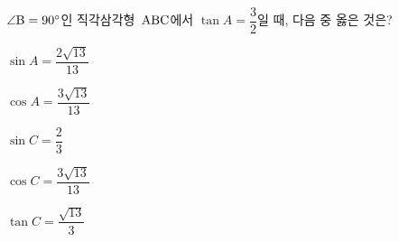 $\angle\mathrm{B}=90^\circ$인 직각삼각형~$\mathrm{ABC}$에서 $\tan A=\dfrac{3}{2}$일 때, 다음 중 옳은 것은?
\begin{choicesii}{\rule[-3ex]{0pt}{8ex}$\sin A=\dfrac{2\sqrt{13}}{13}$}{\rule[-3ex]{0pt}{8ex}$\cos A=\dfrac{3\sqrt{13}}{13}$}{\rule[-3ex]{0pt}{8ex}$\sin C=\dfrac{2}{3}$}{\rule[-3ex]{0pt}{8ex}$\cos C=\dfrac{3\sqrt{13}}{13}$}{\rule[-3ex]{0pt}{8ex}$\tan C=\dfrac{\sqrt{13}}{3}$}\end{choicesii}
